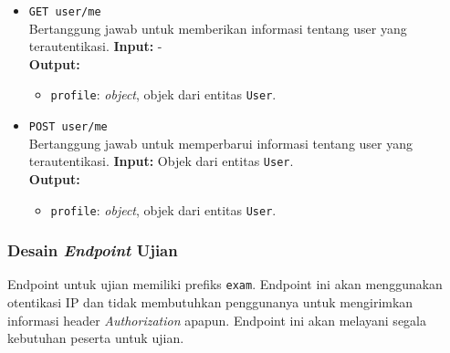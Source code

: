 \begin{itemize}
        \item \texttt{GET user/me} \\
            Bertanggung jawab untuk memberikan informasi tentang user yang
            terautentikasi.
            \textbf{Input:} -\\
            \textbf{Output:}
            \begin{itemize}
                \item \texttt{profile}: \textit{object}, objek dari entitas
                    \texttt{User}.
            \end{itemize}
            
        \item \texttt{POST user/me} \\
            Bertanggung jawab untuk memperbarui informasi tentang user yang
            terautentikasi.
            \textbf{Input:} Objek dari entitas \texttt{User}.\\
            \textbf{Output:}
            \begin{itemize}
                \item \texttt{profile}: \textit{object}, objek dari entitas
                    \texttt{User}.
            \end{itemize}
    \end{itemize}
    
\subsubsection{Desain \textit{Endpoint} Ujian} Endpoint untuk ujian memiliki
    prefiks \texttt{exam}. Endpoint ini akan menggunakan otentikasi IP dan tidak
    membutuhkan penggunanya untuk mengirimkan informasi header
    \textit{Authorization} apapun. Endpoint ini akan melayani segala kebutuhan
    peserta untuk ujian.
    
